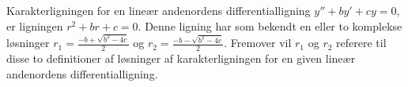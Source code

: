 \begin{definition}[Karakterligningen]
Karakterligningen for en lineær andenordens differentialligning $y'' + by' + cy = 0$, er ligningen $r^2 + br + c = 0$. 
Denne ligning har som bekendt en eller to komplekse løsninger $r_1 = \frac{-b + \sqrt{b^2 - 4c}}{2}$ og $r_2 = \frac{-b - \sqrt{b^2 - 4c}}{2}$. 
Fremover vil $r_1$ og $r_2$ referere til disse to definitioner af løsninger af karakterligningen for en given lineær andenordens differentialligning.

\end{definition}